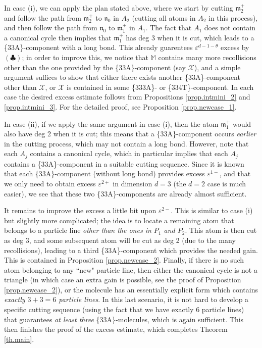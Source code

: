 \documentclass[10pt, reqno]{amsart}
\newcommand{\Mb}{\mathbb M}
\newcommand{\Xc}{\mathcal X}
\newcommand{\mf}{\mathfrak m}
\newcommand{\nf}{\mathfrak n}
\theoremstyle{definition}
\theoremstyle{remark}
\numberwithin{equation}{section}
\begin{document}
\smallskip
In case (i), we can apply the plan stated above, where we start by cutting $\mf_2^+$ and follow the path from $\mf_2^+$ to $\nf_0$ in $A_2$ (cutting all atoms in $A_2$ in this process), and then follow the path from $\nf_0$ to $\mf_1^+$ in $A_1$. The fact that $A_1$ does not contain a canonical cycle then implies that $\mf_1^+$ has deg 3 when it is cut, which leads to a \{33A\}-component with a long bond. This already guarentees $\varepsilon^{d-1-\theta}$ excess by $(\clubsuit)$; in order to improve this, we notice that $\Mb$ contains many more recollisions other than the one provided by the \{33A\}-component (say $\Xc$), and a simple argument suffices to show that either there exists another \{33A\}-component other than $\Xc$, or $\Xc$ is contained in some \{333A\}- or \{334T\}-component. In each case the desired excess estimate follows from Propositions \ref{prop.intmini_2} and \ref{prop.intmini_3}. For the detailed proof, see Proposition \ref{prop.newcase_1}.

\smallskip
In case (ii), if we apply the same argument in case (i), then the atom $\mf_1^+$ would also have deg 2 when it is cut; this means that a \{33A\}-component occurs \emph{earlier} in the cutting process, which may not contain a long bond. However, note that each $A_j$ contains a canonical cycle, which in particular implies that each $A_j$ contains a \{33A\}-component in a suitable cutting sequence. Since it is known that each \{33A\}-component (without long bond) provides excess $\varepsilon^{1-}$, and that we only need to obtain excess $\varepsilon^{2+}$ in dimension $d=3$ (the $d=2$ case is much easier), we see that these two \{33A\}-components are already almost sufficient.

It remains to improve the excess a little bit upon $\varepsilon^{2-}$. This is similar to case (i) but slightly more complicated; the idea is to locate a remaining atom that belongs to a particle line \emph{other than the ones in $P_1$ and $P_2$}. This atom is then cut as deg 3, and some subsequent atom will be cut as deg 2 (due to the many recollisions), leading to a third \{33A\}-component which provides the needed gain. This is contained in Proposition \ref{prop.newcase_2}. Finally, if there is no such atom belonging to any ``new" particle line, then either the canonical cycle is not a triangle (in which case an extra gain is possible, see the proof of Proposition \ref{prop.newcase_2}), or the molecule has an essentially explicit form which contains \emph{exactly $3+3=6$ particle lines}. In this last scenario, it is not hard to develop a specific cutting sequence (using the fact that we have exactly 6 particle lines) that guarantees \emph{at least three} \{33A\}-molecules, which is again sufficient. This then finishes the proof of the excess estimate, which completes Theorem \ref{th.main}.
\end{document}
